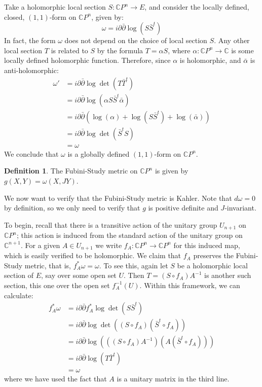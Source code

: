 \documentclass[11pt]{amsart}
\theoremstyle{definition}
\newtheorem{definition}[subsection]{Definition}
\def \CP{ \mathbb{C}P }
\def \C{ \mathbb{C} }
\def \del{ \partial }
\def \delbar{ \bar{\partial} }
\begin{document}
Take a holomorphic local section $S: \CP^n \rightarrow E$, and consider the locally defined, closed, $(1,1)$-form on $\CP^n$, given by:
%
$$ \omega = i \del \delbar \log ( S \bar{S}^{t} ) $$
%
In fact, the form $\omega$ does not depend on the choice of local section $S$. Any other local section $T$ is related to $S$ by the formula $T = \alpha S $, where $\alpha: \CP^n \rightarrow \C $ is some locally defined holomorphic function.  Therefore, since $\alpha$ is holomorphic, and $\bar{\alpha}$ is anti-holomorphic:
%
\begin{align*} \omega' &= i \del \delbar \log \det ( T \bar{T}^{t} ) \\
&= i \del \delbar \log ( \alpha S \bar{S}^t \bar{\alpha} ) \\
&= i \del \delbar( \log (\alpha) + \log( S \bar{S}^t ) + \log( \bar{\alpha} ) ) \\
&= i \del \delbar \log \det ( \bar{S}^{t} S ) \\
&= \omega
\end{align*}
%
We conclude that $\omega$ is a globally defined $(1,1)$-form on $\CP^n$.
%
\begin{definition} The Fubini-Study metric on $\CP^n$ is given by $g(X,Y) = \omega(X,JY)$.
\end{definition}
%
We now want to verify that the Fubini-Study metric is Kahler.  Note that $d \omega = 0$ by definition, so we only need to verify that $g$ is positive definite and $J$-invariant.

To begin, recall that there is a transitive action of the unitary group $U_{n+1}$ on $\CP^n$; this action is induced from the standard action of the unitary group on $\C^{n+1}$.  For a given $A \in U_{n+1}$ we write $f_{A}: \CP^n \rightarrow \CP^n$ for this induced map, which is easily verified to be holomorphic.  We claim that $f_A$ preserves the Fubini-Study metric, that is, $f^{\ast}_A \omega = \omega$.  To see this, again let $S$ be a holomorphic local section of $E$, say over some open set $U$.  Then $T = ( S \circ f_A )A^{-1} $ is another such section, this one over the open set $f_A^{-1}(U)$.  Within this framework, we can calculate:
%
\begin{align*} f^{\ast}_A \omega &= i \del \delbar f^{\ast}_A \log \det ( S \bar{S}^t ) \\
&= i \del \delbar \log \det ( ( S \circ f_A ) ( \bar{S}^t \circ f_A ) ) \\
&= i \del \delbar \log ( ( ( S \circ f_A ) A^{-1} ) ( A (\bar{S}^t \circ f_A ) ) )\\
&= i \del \delbar \log ( T \bar{T}^t ) \\
&= \omega 
\end{align*}
%
where we have used the fact that $A$ is a unitary matrix in the third line.
\end{document}
